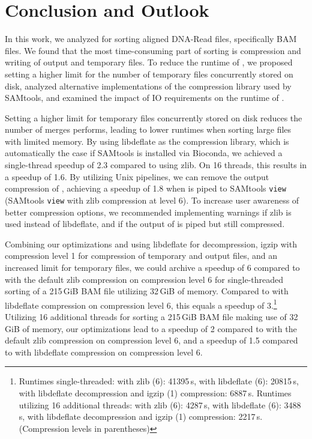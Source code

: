 \section{Conclusion and Outlook}

In this work, we analyzed \sort for sorting aligned DNA-Read files, specifically BAM files. We found that the most time-consuming part of sorting is compression and writing of output and temporary files. To reduce the runtime of \sort, we proposed setting a higher limit for the number of temporary files concurrently stored on disk, analyzed alternative implementations of the compression library used by SAMtools, and examined the impact of IO requirements on the runtime of \sort.

Setting a higher limit for temporary files concurrently stored on disk reduces the number of merges \sort performs, leading to lower runtimes when sorting large files with limited memory.
By using libdeflate as the compression library, which is automatically the case if SAMtools is installed via Bioconda, we achieved a single-thread speedup of 2.3 compared to using zlib. On 16 threads, this results in a speedup of 1.6.
By utilizing Unix pipelines, we can remove the output compression of \sort, achieving a speedup of 1.8 when \sort is piped to SAMtools \texttt{view} (SAMtools \texttt{view} with zlib compression at level 6).
To increase user awareness of better compression options, we recommended implementing warnings if zlib is used instead of libdeflate, and if the output of \sort is piped but still compressed. 

Combining our optimizations and using libdeflate for decompression, igzip with compression level 1 for compression of temporary and output files, and an increased limit for temporary files, we could archive a speedup of 6 compared to \sort with the default zlib compression on compression level 6 for single-threaded sorting of a 215\,GiB BAM file utilizing 32\,GiB of memory. Compared to \sort with libdeflate compression on compression level 6, this equals a speedup of 3.\footnote{
Runtimes single-threaded: with zlib (6): 41395\,s, with libdeflate (6): 20815\,s, with libdeflate decompression and igzip (1) compression: 6887\,s. 
Runtimes utilizing 16 additional threads: with zlib (6): 4287\,s, with libdeflate (6): 3488\,s, with libdeflate decompression and igzip (1) compression: 2217\,s. (Compression levels in parentheses)
}
Utilizing 16 additional threads for sorting a 215\,GiB BAM file making use of 32\,GiB of memory, our optimizations lead to a speedup of 2 compared to \sort with the default zlib compression on compression level 6, and a speedup of 1.5 compared to \sort with libdeflate compression on compression level 6. 

